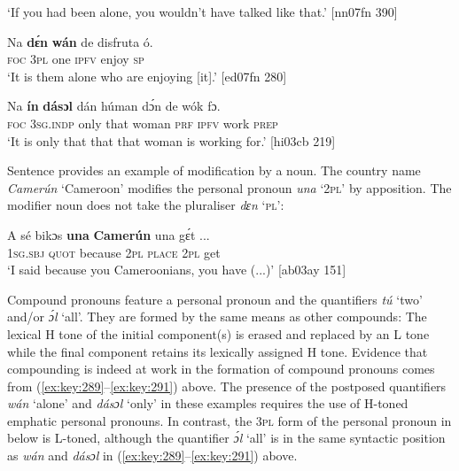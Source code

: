 \glt ‘If you had been alone, you wouldn’t have talked like that.’ [nn07fn 390]
\z


\ea%
    \label{ex:key:290}
    \gll Na  \textbf{dɛ́n}    \textbf{wán}    de  disfruta  ó.\\
\textsc{foc}  \textsc{3pl}    one    \textsc{ipfv}  enjoy  \textsc{sp}\\

\glt ‘It is them alone who are enjoying [it].’ [ed07fn 280]
\z


\ea%
    \label{ex:key:291}
    \gll Na  \textbf{ín} \textbf{   dásɔl}  dán  húman  dɔ́n  de  wók    fɔ.\\
\textsc{foc}  \textsc{3sg.indp}  only    that  woman  \textsc{prf}  \textsc{ipfv}  work  \textsc{prep}\\

\glt ‘It is only that that that woman is working for.’ [hi03cb 219]
\z

Sentence  provides an example of modification by a noun. The country name \textit{Camerún} ‘Cameroon’ modifies the personal pronoun \textit{una} ‘\textsc{2pl}’ by apposition. The modifier noun does not take the pluraliser \textit{dɛn} ‘\textsc{pl}’:


\ea%
    \label{ex:key:292}
    \gll A    sé    bikɔs  \textbf{una}  \textbf{Camerún}  una  gɛ́t  \op...\cp{}\\
\textsc{1sg.sbj}  \textsc{quot}    because  \textsc{2pl}  \textsc{place}    \textsc{2pl}  get\\

\glt ‘I said because you Cameroonians, you have (...)’ [ab03ay 151]
\z

Compound pronouns feature a personal pronoun and the quantifiers \textit{tú} ‘two’ and/or \textit{ɔ́l} ‘all’. They are formed by the same means as other compounds: The lexical H tone of the initial component(s) is erased and replaced by an L tone while the final component retains its lexically assigned H tone. Evidence that compounding is indeed at work in the formation of compound pronouns comes from (\ref{ex:key:289}–\ref{ex:key:291}) above. The presence of the postposed quantifiers \textit{wán} ‘alone’ and \textit{dásɔl} ‘only’ in these examples requires the use of H-toned emphatic personal pronouns. In contrast, the \textsc{3pl} form of the personal pronoun in  below is L-toned, although the quantifier \textit{ɔ́l} ‘all’ is in the same syntactic position as \textit{wán} and \textit{dásɔl} in (\ref{ex:key:289}–\ref{ex:key:291}) above. 


